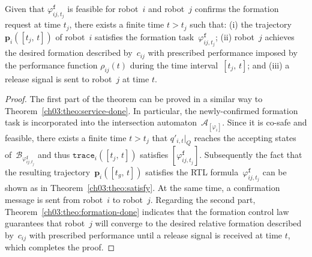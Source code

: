 \begin{theorem}\label{ch03:theo:formation-done}
  Given that $\varphi_{ij,t_j}^{\texttt{f}}$ is feasible for robot~$i$ and robot~$j$ confirms the formation request at time $t_j$,  there exists a finite time $t>t_j$ such that: (i) the trajectory $\mathbf{p}_i([t_j,\,t])$ of robot~$i$ satisfies the formation task~$\varphi_{ij,t_j}^{\texttt{f}}$; (ii) robot~$j$ achieves the desired formation described by~$c_{ij}$ with prescribed performance imposed by the performance function $\rho_{ij}(t)$ during the time interval~$[t_j,\,t]$; and (iii) a release signal is sent to robot~$j$ at time $t$.
\end{theorem}
\begin{proof}
The first part of the theorem can be proved in a similar way to Theorem~\ref{ch03:theo:service-done}. In particular, the newly-confirmed formation task is incorporated into the intersection automaton~$\mathcal{A}_{[\varphi_i]}$. Since it is co-safe and feasible, there exists a finite time $t>t_j$ that $q'_{i,t}|_{Q}$ reaches the accepting states of~$\mathcal{B}_{\varphi^\texttt{f}_{ij,t_j}}$ and thus $\texttt{trace}_{i}([t_j,\, t])$ satisfies $[\varphi_{ij,t_j}^{\texttt{f}}]$. Subsequently the fact that the resulting trajectory~$\mathbf{p}_i([t_g,\,t])$ satisfies the RTL formula~$\varphi_{ij,t_j}^{\texttt{f}}$ can be shown as in Theorem~\ref{ch03:theo:satisfy}.
At the same time, a confirmation message is sent from robot~$i$ to robot~$j$.
Regarding the second part, Theorem~\ref{ch03:theo:formation-done} indicates that the formation control law guarantees that robot~$j$ will converge to the desired relative formation described by~$c_{ij}$ with prescribed performance until a release signal is received at time $t$, which completes the proof.
\end{proof}
